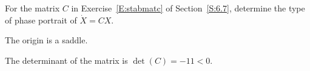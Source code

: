 \documentclass{ximera}
\begin{document}
\begin{exercise} \label{c6.8.1c}
For the matrix $C$ in Exercise~\ref{E:stabmatc}  of Section~\ref{S:6.7},
determine the type of phase portrait of $\dot{X}=CX$.

\begin{solution}
\ans The origin is a saddle.

\soln The determinant of the matrix is $\det(C) = -11 < 0$.

\end{solution}
\end{exercise}
\end{document}
